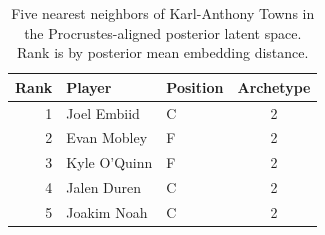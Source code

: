 \begin{table}[htbp]
  \centering\small
  \begin{tabular}{rllc}
    \toprule
    Rank & Player & Position & Archetype \\
    \midrule
    1 & Joel Embiid & C & 2 \\
    2 & Evan Mobley & F & 2 \\
    3 & Kyle O'Quinn & F & 2 \\
    4 & Jalen Duren & C & 2 \\
    5 & Joakim Noah & C & 2 \\
    \bottomrule
  \end{tabular}
  \caption{Five nearest neighbors of Karl-Anthony Towns in the Procrustes-aligned posterior latent space. Rank is by posterior mean embedding distance.}
  \label{tab:Karl_Anthony_Towns_neighbors}
\end{table}

